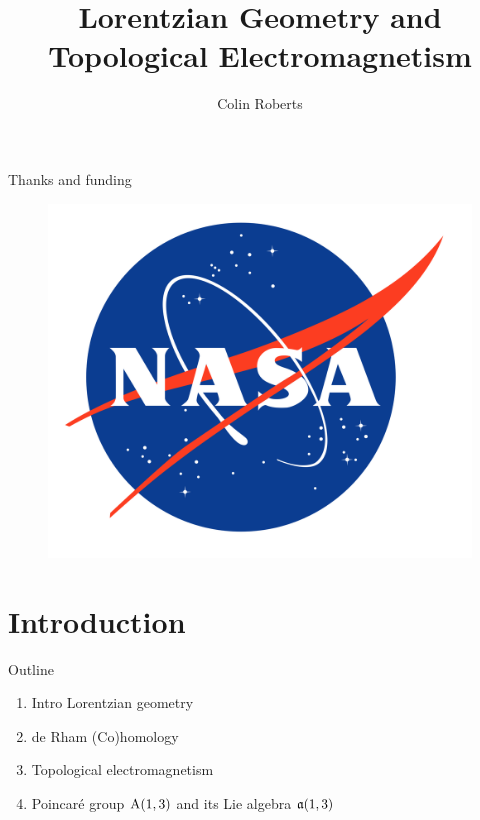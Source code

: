 \documentclass[UKenglish]{beamer}
\title{Lorentzian Geometry and Topological Electromagnetism}
\author{Colin Roberts}
\begin{document}

\begin{frame}{}
    Thanks and funding
    \begin{figure}[h]
    \includegraphics[scale=.05]{figures/NASA_logo.svg.png}
    \end{figure}
\end{frame}


\section{Introduction}



\begin{frame}{Outline}
\vfill
\begin{enumerate}
    \item Intro Lorentzian geometry
    \item de Rham (Co)homology
    \item Topological electromagnetism
    \item Poincar\'e group $\operatorname{A}(1,3)$ and its Lie algebra $\mathfrak{a}(1,3)$
\end{enumerate}
\vfill
\end{frame}
\end{document}
